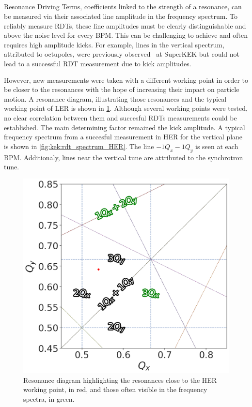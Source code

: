 \FloatBarrier
\subsection{}

Resonance Driving Terms, coefficients linked to the strength of a resonance, can be measured via
their associated line amplitude in the frequency spectrum. To reliably measure RDTs, these
line amplitudes must be clearly distinguishable and above the noise level for every BPM. This can be
challenging to achieve and often requires high amplitude kicks.
For example, lines in the vertical spectrum, attributed to octupoles, were previously
observed~\cite{keintzel_jacqueline_beam_2022} at SuperKEK but could not lead to a successful RDT measurement due
to kick amplitudes.

However, new measurements were taken with a different working point in order to be closer to the 
resonances with the hope of increasing their impact on particle motion. A resonance diagram,
illustrating those resonances and the typical working point of LER is shown in
\cref{fig:kek:tune_diagram}. Although several working points were tested, no clear correlation
between them and succesful RDTs measurements could be established. The main determining factor
remained the kick amplitude. A typical frequency spectrum from a succesful measurement in HER for
the vertical plane is shown in \cref{fig:kek:rdt_spectrum_HER}. The line $-1Q_x - 1Q_y$ is seen at
each BPM. Additionaly, lines near the vertical tune are attributed to the synchrotron tune.

\begin{figure}[!htb]
    \centering
    \includegraphics[width=0.6\linewidth]{images/kek/tune_diagram.png}
    \caption{Resonance diagram highlighting the resonances close to the HER working point, in red, 
    and those often visible in the frequency spectra, in green.}
    \label{fig:kek:tune_diagram}
\end{figure}

